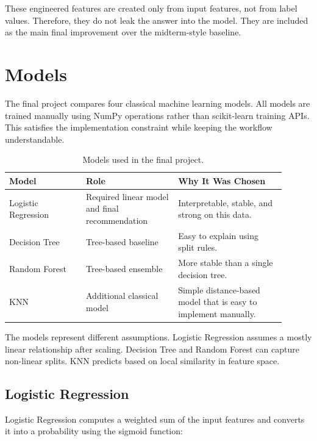 ﻿\documentclass[12pt,a4paper]{article}
\begin{document}
These engineered features are created only from input features, not from label values. Therefore, they do not leak the answer into the model. They are included as the main final improvement over the midterm-style baseline.

\clearpage

\section{Models}

The final project compares four classical machine learning models. All models are trained manually using NumPy operations rather than scikit-learn training APIs. This satisfies the implementation constraint while keeping the workflow understandable.

\begin{table}[H]
\centering
\caption{Models used in the final project.}
\small
\begin{tabular}{L{0.25\linewidth}L{0.30\linewidth}L{0.35\linewidth}}
\toprule
\textbf{Model} & \textbf{Role} & \textbf{Why It Was Chosen} \\
\midrule
Logistic Regression & Required linear model and final recommendation & Interpretable, stable, and strong on this data. \\
Decision Tree & Tree-based baseline & Easy to explain using split rules. \\
Random Forest & Tree-based ensemble & More stable than a single decision tree. \\
KNN & Additional classical model & Simple distance-based model that is easy to implement manually. \\
\bottomrule
\end{tabular}
\end{table}

The models represent different assumptions. Logistic Regression assumes a mostly linear relationship after scaling. Decision Tree and Random Forest can capture non-linear splits. KNN predicts based on local similarity in feature space.

\clearpage

\subsection{Logistic Regression}

Logistic Regression computes a weighted sum of the input features and converts it into a probability using the sigmoid function:
\end{document}
